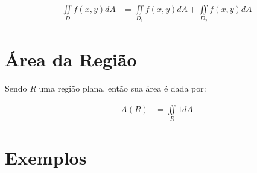 \documentclass{article}
\newcommand{\doubleint}[1] {\iint\limits_R #1 dA}
\theoremstyle{definition}
\begin{document}
        \begin{align*}
            \iint\limits_D f(x,y) dA &= \iint\limits_{D_1} f(x,y) dA + \iint\limits_{D_2} f(x,y) dA
        \end{align*}

    \section{Área da Região}
        Sendo $R$ uma região plana, então sua área é dada por:

        \begin{align*}
            A(R) &= \doubleint{1}
        \end{align*}

    \section{Exemplos}
\end{document}
